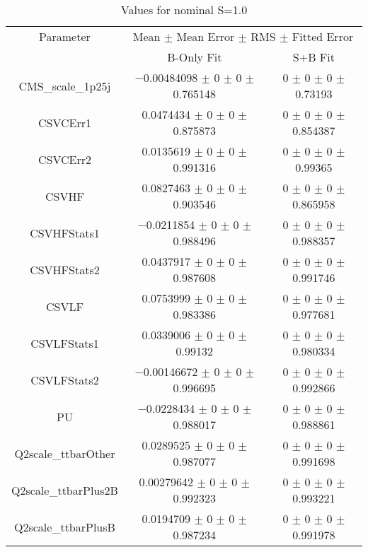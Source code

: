 \begin{table}
\centering
\caption{Values for nominal S=1.0}
\begin{tabular}{ccc}
\toprule
Parameter & \multicolumn{2}{c}{Mean $\pm$ Mean Error $\pm$ RMS $\pm$ Fitted Error}\\
 & B-Only Fit & S+B Fit\\
\midrule
CMS\_scale\_1p25j & \num{-0.00484098} $\pm$ \num{0} $\pm$ \num{0} $\pm$ \num{0.765148} & \num{0} $\pm$ \num{0} $\pm$ \num{0} $\pm$ \num{0.73193}\\
CSVCErr1 & \num{0.0474434} $\pm$ \num{0} $\pm$ \num{0} $\pm$ \num{0.875873} & \num{0} $\pm$ \num{0} $\pm$ \num{0} $\pm$ \num{0.854387}\\
CSVCErr2 & \num{0.0135619} $\pm$ \num{0} $\pm$ \num{0} $\pm$ \num{0.991316} & \num{0} $\pm$ \num{0} $\pm$ \num{0} $\pm$ \num{0.99365}\\
CSVHF & \num{0.0827463} $\pm$ \num{0} $\pm$ \num{0} $\pm$ \num{0.903546} & \num{0} $\pm$ \num{0} $\pm$ \num{0} $\pm$ \num{0.865958}\\
CSVHFStats1 & \num{-0.0211854} $\pm$ \num{0} $\pm$ \num{0} $\pm$ \num{0.988496} & \num{0} $\pm$ \num{0} $\pm$ \num{0} $\pm$ \num{0.988357}\\
CSVHFStats2 & \num{0.0437917} $\pm$ \num{0} $\pm$ \num{0} $\pm$ \num{0.987608} & \num{0} $\pm$ \num{0} $\pm$ \num{0} $\pm$ \num{0.991746}\\
CSVLF & \num{0.0753999} $\pm$ \num{0} $\pm$ \num{0} $\pm$ \num{0.983386} & \num{0} $\pm$ \num{0} $\pm$ \num{0} $\pm$ \num{0.977681}\\
CSVLFStats1 & \num{0.0339006} $\pm$ \num{0} $\pm$ \num{0} $\pm$ \num{0.99132} & \num{0} $\pm$ \num{0} $\pm$ \num{0} $\pm$ \num{0.980334}\\
CSVLFStats2 & \num{-0.00146672} $\pm$ \num{0} $\pm$ \num{0} $\pm$ \num{0.996695} & \num{0} $\pm$ \num{0} $\pm$ \num{0} $\pm$ \num{0.992866}\\
PU & \num{-0.0228434} $\pm$ \num{0} $\pm$ \num{0} $\pm$ \num{0.988017} & \num{0} $\pm$ \num{0} $\pm$ \num{0} $\pm$ \num{0.988861}\\
Q2scale\_ttbarOther & \num{0.0289525} $\pm$ \num{0} $\pm$ \num{0} $\pm$ \num{0.987077} & \num{0} $\pm$ \num{0} $\pm$ \num{0} $\pm$ \num{0.991698}\\
Q2scale\_ttbarPlus2B & \num{0.00279642} $\pm$ \num{0} $\pm$ \num{0} $\pm$ \num{0.992323} & \num{0} $\pm$ \num{0} $\pm$ \num{0} $\pm$ \num{0.993221}\\
Q2scale\_ttbarPlusB & \num{0.0194709} $\pm$ \num{0} $\pm$ \num{0} $\pm$ \num{0.987234} & \num{0} $\pm$ \num{0} $\pm$ \num{0} $\pm$ \num{0.991978}\\

\end{tabular}
\end{table}
